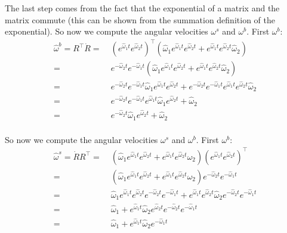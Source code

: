 \documentclass[english]{article}
\begin{document}
The last step comes from the fact that the exponential of a matrix and the matrix commute (this can be shown from the summation definition of the exponential). So now we compute the angular velocities $\omega^s$ and $\omega^b$. First $\omega^b$:
\begin{align*}
\hat{\omega}^b = R^\top \dot{R} =&\; \left( e^{\hat{\omega}_1 t} e^{\hat{\omega}_2 t} \right)^\top \left(\hat{\omega}_1 e^{\hat{\omega}_1 t} e^{\hat{\omega}_2 t} + e^{\hat{\omega}_1 t} e^{\hat{\omega}_2 t} \hat{\omega}_2\right) \\
 =&\;  e^{-\hat{\omega}_2 t} e^{-\hat{\omega}_1 t} \left(\hat{\omega}_1 e^{\hat{\omega}_1 t} e^{\hat{\omega}_2 t} + e^{\hat{\omega}_1 t} e^{\hat{\omega}_2 t} \hat{\omega}_2\right) \\
 =&\;  e^{-\hat{\omega}_2 t} e^{-\hat{\omega}_1 t} \hat{\omega}_1 e^{\hat{\omega}_1 t} e^{\hat{\omega}_2 t} + e^{-\hat{\omega}_2 t} e^{-\hat{\omega}_1 t} e^{\hat{\omega}_1 t} e^{\hat{\omega}_2 t} \hat{\omega}_2 \\
 =&\; e^{-\hat{\omega}_2 t} e^{-\hat{\omega}_1 t} e^{\hat{\omega}_1 t} \hat{\omega}_1 e^{\hat{\omega}_2 t} + \hat{\omega}_2 \\
 =&\; e^{-\hat{\omega}_2 t} \hat{\omega}_1 e^{\hat{\omega}_2 t} + \hat{\omega}_2 \\
\end{align*}

So now we compute the angular velocities $\omega^s$ and $\omega^b$. First $\omega^b$:
\begin{align*}
\hat{\omega}^s = \dot{R} R^\top =&\; \left(\hat{\omega}_1 e^{\hat{\omega}_1 t} e^{\hat{\omega}_2 t} + e^{\hat{\omega}_1 t} e^{\hat{\omega}_2 t} \hat{\omega}_2\right) \left( e^{\hat{\omega}_1 t} e^{\hat{\omega}_2 t} \right)^\top  \\
=&\; \left(\hat{\omega}_1 e^{\hat{\omega}_1 t} e^{\hat{\omega}_2 t} + e^{\hat{\omega}_1 t} e^{\hat{\omega}_2 t} \hat{\omega}_2\right) e^{-\hat{\omega}_2 t} e^{-\hat{\omega}_1 t}   \\
=&\; \hat{\omega}_1 e^{\hat{\omega}_1 t} e^{\hat{\omega}_2 t} e^{-\hat{\omega}_2 t} e^{-\hat{\omega}_1 t} + e^{\hat{\omega}_1 t} e^{\hat{\omega}_2 t} \hat{\omega}_2 e^{-\hat{\omega}_2 t} e^{-\hat{\omega}_1 t} \\
=&\; \hat{\omega}_1 + e^{\hat{\omega}_1 t} \hat{\omega}_2 e^{\hat{\omega}_2 t}  e^{-\hat{\omega}_2 t} e^{-\hat{\omega}_1 t} \\
=&\; \hat{\omega}_1 + e^{\hat{\omega}_1 t} \hat{\omega}_2 e^{-\hat{\omega}_1 t} \\
\end{align*}
\end{document}
